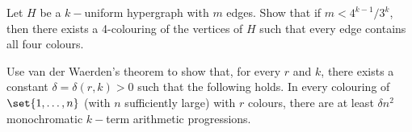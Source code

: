 \documentclass[english]{IMTexam}
\begin{document}
\begin{questions}
\begin{solution}
			\hfill\qedsymbol
			
		\end{solution}
		
		\question Let $ H $ be a $ k- $uniform hypergraph with $ m $ edges. Show that if $ m < 4^{k-1} /3^{k} $, then there exists a 4-colouring of the vertices of $ H $ such that every edge contains all four colours.
		
%			 
%			

			
		
		\question Use van der Waerden’s theorem to show that, for every $ r $ and $ k $, there exists a constant $ \delta = \delta(r, k) > 0 $ such that the following holds. In every colouring of $ \set{1, \ldots, n} $ (with $ n $ sufficiently large) with $ r $ colours, there are at least $ \delta n^{2} $ monochromatic $ k- $term arithmetic progressions.
		
%			
%			
%			
		

\end{questions}
\end{document}
